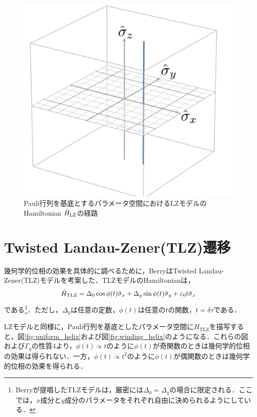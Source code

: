 \documentclass[a4paper, titlepage]{jsreport}
\begin{document}
\begin{figure}
  \centering
  \includegraphics[scale=0.7]{figures/LZ_Pauli.png}
  \caption{Pauli行列を基底とするパラメータ空間におけるLZモデルのHamiltonian $\Hat{H}_{\mathrm{LZ}}$の経路}
  \label{fig:LZ_Pauli}
\end{figure}

\section{Twisted Landau-Zener(TLZ)遷移}
幾何学的位相の効果を具体的に調べるために，BerryはTwisted Landau-Zener(TLZ)モデルを考案した\cite{Berry1990}．TLZモデルのHamiltonianは，
\begin{equation}
 \Hat{H}_{\mathrm{TLZ}} =\Delta_0 \cos \phi(t) \Hat{\sigma}_x + \Delta_y \sin \phi(t) \Hat{\sigma}_y + \varepsilon_0 t \Hat{\sigma}_z
\end{equation}
である\footnote{Berryが提唱したTLZモデルは，厳密には$\Delta_0 = \Delta_y$の場合に限定される．ここでは，$x$成分と$y$成分のパラメータをそれぞれ自由に決められるようにしている．}．ただし，$\Delta_y$は任意の定数，$\phi(t)$は任意の$t$の関数，$t = \delta \tau$である．


LZモデルと同様に，Pauli行列を基底としたパラメータ空間に$H_{\mathrm{TLZ}}$を描写すると，図\ref{fig:uniform_helix}および図\ref{fig:winding_helix}のようになる．これらの図および$\Gamma_g$の性質4より，$\phi(t) \propto t$のように$\phi(t)$が奇関数のときは幾何学的位相の効果は得られない．一方，$\phi(t) \propto t^2$のように$\phi(t)$が偶関数のときは幾何学的位相の効果を得られる．
\end{document}
